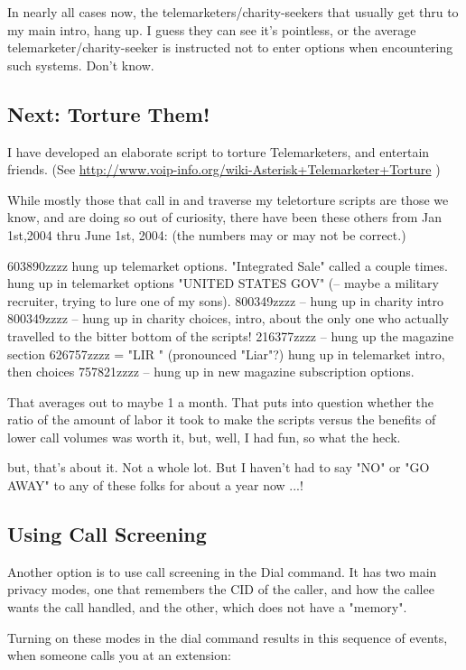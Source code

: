 In nearly all cases now, the telemarketers/charity-seekers that
usually get thru to my main intro, hang up. I guess they can see it's
pointless, or the average telemarketer/charity-seeker is instructed
not to enter options when encountering such systems. Don't know.


\subsection{Next: Torture Them!}

I have developed an elaborate script to torture Telemarketers, and
entertain friends. (See
\url{http://www.voip-info.org/wiki-Asterisk+Telemarketer+Torture} )

While mostly those that call in and traverse my teletorture scripts
are those we know, and are doing so out of curiosity, there have been
these others from Jan 1st,2004 thru June 1st, 2004:
(the numbers may or may not be correct.)

603890zzzz     hung up telemarket options.
"Integrated Sale"  called a couple times. hung up in telemarket options
"UNITED STATES GOV"  (-- maybe a military recruiter, trying to lure one of my sons).
800349zzzz -- hung up in charity intro
800349zzzz -- hung up in charity choices, intro, about the only one who actually travelled to the bitter bottom of the scripts!
216377zzzz -- hung up the magazine section
626757zzzz = "LIR    " (pronounced "Liar"?) hung up in telemarket intro, then choices
757821zzzz -- hung up in new magazine subscription options.

That averages out to maybe 1 a month. That puts into question whether
the ratio of the amount of labor it took to make the scripts versus
the benefits of lower call volumes was worth it, but, well, I had fun,
so what the heck.

but, that's about it. Not a whole lot. But I haven't had to say "NO"
or "GO AWAY" to any of these folks for about a year now ...!

\subsection{Using Call Screening}

Another option is to use call screening in the Dial command. It has
two main privacy modes, one that remembers the CID of the caller, and
how the callee wants the call handled, and the other, which does not
have a "memory".

Turning on these modes in the dial command results in this sequence of
events, when someone calls you at an extension:

